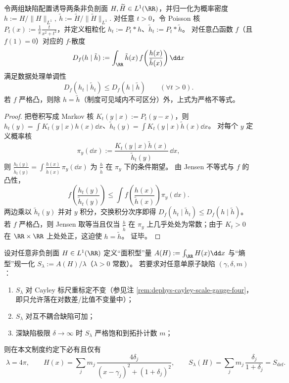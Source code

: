 \begin{proposition}\label{prop:xi-poisson-coarsegraining-f-divergence-contraction}
令两组缺陷配置诱导两条非负剖面 \(H,\widetilde H\in L^1(\RR)\)，并归一化为概率密度
\(
h:=H/\|H\|_{L^1},\ \tilde h:=\widetilde H/\|\widetilde H\|_{L^1}.
\)
对任意 \(t>0\)，令 Poisson 核 \(P_t(x):=\frac{1}{\pi}\frac{t}{x^2+t^2}\)，并定义粗粒化 \(h_t:=P_t*h\)、\(\tilde h_t:=P_t*\tilde h\)。
对任意凸函数 \(f\)（且 \(f(1)=0\)）对应的 \(f\)-散度
\[
D_f(h\mid \tilde h):=\int_{\RR}\tilde h(x)\,f\!\left(\frac{h(x)}{\tilde h(x)}\right)\dd x
\]
满足数据处理单调性
\[
\boxed{\;
D_f(h_t\mid \tilde h_t)\le D_f(h\mid \tilde h)\qquad(\forall t>0).\;}
\]
若 \(f\) 严格凸，则除 \(h=\tilde h\)（制度可见域内不可区分）外，上式为严格不等式。
\end{proposition}

\begin{proof}
把卷积写成 Markov 核 \(K_t(y\mid x):=P_t(y-x)\)，则
\(
h_t(y)=\int K_t(y\mid x)h(x)\dd x
\)、\(
\tilde h_t(y)=\int K_t(y\mid x)\tilde h(x)\dd x
\)。
对每个 \(y\) 定义概率核
\[
\pi_y(\dd x):=\frac{K_t(y\mid x)\tilde h(x)}{\tilde h_t(y)}\,\dd x,
\]
则
\(
\frac{h_t(y)}{\tilde h_t(y)}=\int \frac{h(x)}{\tilde h(x)}\,\pi_y(\dd x)
\)
为 \(\frac{h}{\tilde h}\) 在 \(\pi_y\) 下的条件期望。
由 Jensen 不等式与 \(f\) 的凸性，
\[
f\!\left(\frac{h_t(y)}{\tilde h_t(y)}\right)
\le
\int f\!\left(\frac{h(x)}{\tilde h(x)}\right)\pi_y(\dd x).
\]
两边乘以 \(\tilde h_t(y)\) 并对 \(y\) 积分，交换积分次序即得
\(
D_f(h_t\mid \tilde h_t)\le D_f(h\mid \tilde h)
\)。
若 \(f\) 严格凸，则 Jensen 取等当且仅当 \(\frac{h}{\tilde h}\) 在 \(\pi_y\) 上几乎处处为常数；由于 \(K_t>0\) 在 \(\RR\times\RR\) 上处处正，这迫使 \(h=\tilde h\)。
证毕。
\end{proof}

\begin{proposition}\label{prop:xi-fourpi-entropy-normalization-uniqueness}
设对任意非负剖面 \(H\in L^1(\RR)\) 定义“面积型”量 \(A(H):=\int_{\RR}H(x)\dd x\) 与“熵型”规一化 \(S_\lambda:=A(H)/\lambda\)（\(\lambda>0\) 常数）。
若要求对任意单原子缺陷 \((\gamma,\delta,m)\)：
\begin{enumerate}
  \item \(S_\lambda\) 对 Cayley 标尺重标定不变（参见注 \ref{rem:dephys-cayley-scale-gauge-four}，即只允许落在对数差/比值不变量中）；
  \item \(S_\lambda\) 对互不耦合缺陷可加；
  \item 深缺陷极限 \(\delta\to\infty\) 时 \(S_\lambda\) 严格饱和到拓扑计数 \(m\)；
\end{enumerate}
则在本文制度约定下必有且仅有
\[
\boxed{\;
\lambda=4\pi,\qquad
H(x)=\sum_{j}m_j\,\frac{4\delta_j}{(x-\gamma_j)^2+(1+\delta_j)^2},\qquad
S_\lambda(H)=\sum_{j}m_j\,\frac{\delta_j}{1+\delta_j}=S_{\mathrm{def}}.\;}
\]
\end{proposition}

